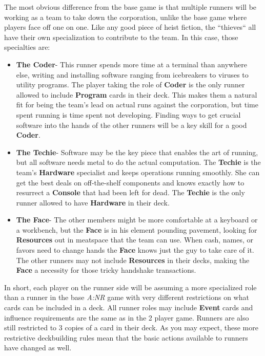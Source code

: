 \documentclass[titlepage]{article}
\begin{document}
The most obvious difference from the base game is that multiple runners will be working as a team to take down the corporation, unlike the base game where players face off one on one. Like any good piece of heist fiction, the ``thieves`` all have their own specialization to contribute to the team. In this case, those specialties are:
\begin{itemize}
	\item \textbf{The Coder}-
		This runner spends more time at a terminal than anywhere else, writing and installing software ranging from icebreakers to viruses to utility programs. The player taking the role of \textbf{Coder} is the only runner allowed to include \textbf{Program} cards in their deck. This makes them a natural fit for being the team's lead on actual runs against the corporation, but time spent running is time spent not developing. Finding ways to get crucial software into the hands of the other runners will be a key skill for a good \textbf{Coder}.
	\item \textbf{The Techie}-
		Software may be the key piece that enables the art of running, but all software needs metal to do the actual computation. The \textbf{Techie} is the team's \textbf{Hardware} specialist and keeps operations running smoothly. She can get the best deals on off-the-shelf components and knows exactly how to resurrect a \textbf{Console} that had been left for dead. The \textbf{Techie} is the only runner allowed to have \textbf{Hardware} in their deck.
	\item \textbf{The Face}-
		The other members might be more comfortable at a keyboard or a workbench, but the \textbf{Face} is in his element pounding pavement, looking for \textbf{Resources} out in meatspace that the team can use. When cash, names, or favors need to change hands the \textbf{Face} knows just the guy to take care of it. The other runners may not include \textbf{Resources} in their decks, making the \textbf{Face} a necessity for those tricky handshake transactions.

\end{itemize}

In short, each player on the runner side will be assuming a more specialized role than a runner in the base \emph{A:NR} game with very different restrictions on what cards can be included in a deck. All runner roles may include \textbf{Event} cards and influence requirements are the same as in the 2 player game. Runners are also still restricted to 3 copies of a card in their deck. As you may expect, these more restrictive deckbuilding rules mean that the basic actions available to runners have changed as well.
\end{document}

